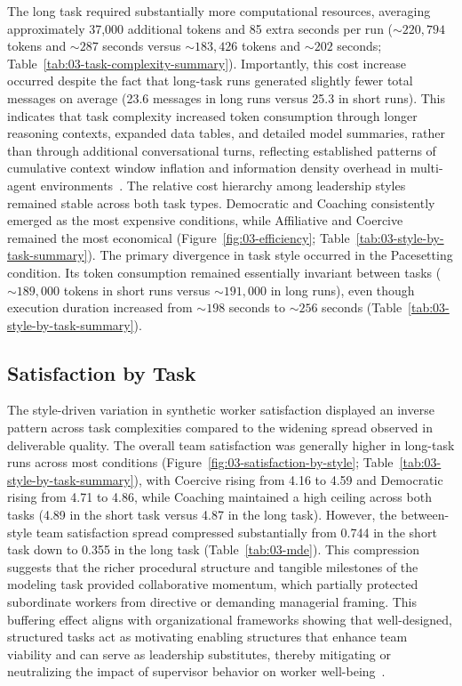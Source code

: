 The long task required substantially more computational resources, averaging approximately 37,000 additional tokens and 85 extra seconds per run ($\sim 220{,}794$ tokens and $\sim 287$ seconds versus $\sim 183{,}426$ tokens and $\sim 202$ seconds; Table~\ref{tab:03-task-complexity-summary}).
Importantly, this cost increase occurred despite the fact that long-task runs generated slightly fewer total messages on average (23.6 messages in long runs versus 25.3 in short runs).
This indicates that task complexity increased token consumption through longer reasoning contexts, expanded data tables, and detailed model summaries, rather than through additional conversational turns, reflecting established patterns of cumulative context window inflation and information density overhead in multi-agent environments~\cite{hong2024metagptmetaprogrammingmultiagent, zhang2024cutcrapeconomicalcommunication}.
The relative cost hierarchy among leadership styles remained stable across both task types.
Democratic and Coaching consistently emerged as the most expensive conditions, while Affiliative and Coercive remained the most economical (Figure~\ref{fig:03-efficiency}; Table~\ref{tab:03-style-by-task-summary}).
The primary divergence in task style occurred in the Pacesetting condition.
Its token consumption remained essentially invariant between tasks ($\sim 189{,}000$ tokens in short runs versus $\sim 191{,}000$ in long runs), even though execution duration increased from $\sim 198$ seconds to $\sim 256$ seconds (Table~\ref{tab:03-style-by-task-summary}).

\subsection{Satisfaction by Task}
\label{subsec:satisfaction-by-task}

The style-driven variation in synthetic worker satisfaction displayed an inverse pattern across task complexities compared to the widening spread observed in deliverable quality.
The overall team satisfaction was generally higher in long-task runs across most conditions (Figure~\ref{fig:03-satisfaction-by-style}; Table~\ref{tab:03-style-by-task-summary}), with Coercive rising from 4.16 to 4.59 and Democratic rising from 4.71 to 4.86, while Coaching maintained a high ceiling across both tasks (4.89 in the short task versus 4.87 in the long task).
However, the between-style team satisfaction spread compressed substantially from 0.744 in the short task down to 0.355 in the long task (Table~\ref{tab:03-mde}).
This compression suggests that the richer procedural structure and tangible milestones of the modeling task provided collaborative momentum, which partially protected subordinate workers from directive or demanding managerial framing.
This buffering effect aligns with organizational frameworks showing that well-designed, structured tasks act as motivating enabling structures that enhance team viability and can serve as leadership substitutes, thereby mitigating or neutralizing the impact of supervisor behavior on worker well-being~\cite{kwak2026leadershipcoordinationcontrolbehavioral, schadowwolf2026effectiveleadership, wageman2005teamdiagnosticsurvey}.
